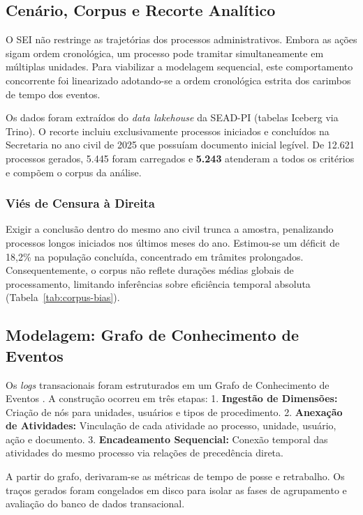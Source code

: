 \subsection{Cenário, Corpus e Recorte Analítico}\label{sec:corpus}

O SEI não restringe as trajetórias dos processos administrativos. Embora as ações sigam ordem cronológica, um processo pode tramitar simultaneamente em múltiplas unidades. Para viabilizar a modelagem sequencial, este comportamento concorrente foi linearizado adotando-se a ordem cronológica estrita dos carimbos de tempo dos eventos.

Os dados foram extraídos do \emph{data lakehouse} da SEAD-PI (tabelas Iceberg via Trino). O recorte incluiu exclusivamente processos iniciados e concluídos na Secretaria no ano civil de 2025 que possuíam documento inicial legível. De 12.621 processos gerados, 5.445 foram carregados e \textbf{5.243} atenderam a todos os critérios e compõem o corpus da análise.

\subsubsection{Viés de Censura à Direita}\label{sec:vies}
Exigir a conclusão dentro do mesmo ano civil trunca a amostra, penalizando processos longos iniciados nos últimos meses do ano. Estimou-se um déficit de 18,2\% na população concluída, concentrado em trâmites prolongados. Consequentemente, o corpus não reflete durações médias globais de processamento, limitando inferências sobre eficiência temporal absoluta (Tabela~\ref{tab:corpus-bias}).



\subsection{Modelagem: Grafo de Conhecimento de Eventos}\label{sec:ekg}

Os \emph{logs} transacionais foram estruturados em um Grafo de Conhecimento de Eventos \cite{vanderaalst2016processmining, esser2021ekg}. A construção ocorreu em três etapas:
1. \textbf{Ingestão de Dimensões:} Criação de nós para unidades, usuários e tipos de procedimento.
2. \textbf{Anexação de Atividades:} Vinculação de cada atividade ao processo, unidade, usuário, ação e documento.
3. \textbf{Encadeamento Sequencial:} Conexão temporal das atividades do mesmo processo via relações de precedência direta.

A partir do grafo, derivaram-se as métricas de tempo de posse e retrabalho. Os traços gerados foram congelados em disco para isolar as fases de agrupamento e avaliação do banco de dados transacional.

